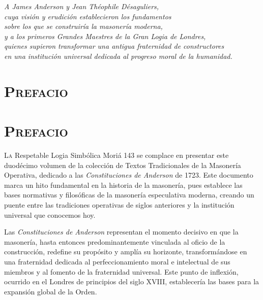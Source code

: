 \documentclass[a4paper,12pt,twoside]{book}
\begin{document}
\thispagestyle{empty}
\clearpage
\null
\thispagestyle{empty}
\clearpage

\thispagestyle{empty}
\vspace*{5cm}
\begin{flushright}
\large
\emph{A James Anderson y Jean Théophile Désaguliers,\\
cuya visión y erudición establecieron los fundamentos\\
sobre los que se construiría la masonería moderna,\\
y a los primeros Grandes Maestres de la Gran Logia de Londres,\\
quienes supieron transformar una antigua fraternidad de constructores\\
en una institución universal dedicada al progreso moral de la humanidad.}
\end{flushright}
\clearpage

\chapter*{\centering\scshape Prefacio}
\thispagestyle{empty}
\chapter*{\centering\scshape Prefacio}
\thispagestyle{empty}
\lettrine[lines=3, lhang=0.1, loversize=0.1]{\textcolor{dorado}{L}}{a} Respetable Logia Simbólica Moriá 143 se complace en presentar este duodécimo volumen de la colección de Textos Tradicionales de la Masonería Operativa, dedicado a las \textit{Constituciones de Anderson} de 1723. Este documento marca un hito fundamental en la historia de la masonería, pues establece las bases normativas y filosóficas de la masonería especulativa moderna, creando un puente entre las tradiciones operativas de siglos anteriores y la institución universal que conocemos hoy.

Las \textit{Constituciones de Anderson} representan el momento decisivo en que la masonería, hasta entonces predominantemente vinculada al oficio de la construcción, redefine su propósito y amplía su horizonte, transformándose en una fraternidad dedicada al perfeccionamiento moral e intelectual de sus miembros y al fomento de la fraternidad universal. Este punto de inflexión, ocurrido en el Londres de principios del siglo XVIII, establecería las bases para la expansión global de la Orden.
\end{document}
